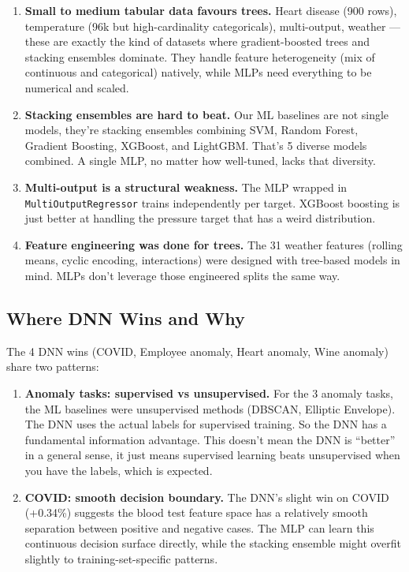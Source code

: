 \documentclass[11pt,a4paper]{article}
\begin{document}
\begin{enumerate}[leftmargin=1.2em,itemsep=0.15em]
    \item \textbf{Small to medium tabular data favours trees.} Heart disease (900 rows), temperature (96k but high-cardinality categoricals), multi-output, weather --- these are exactly the kind of datasets where gradient-boosted trees and stacking ensembles dominate. They handle feature heterogeneity (mix of continuous and categorical) natively, while MLPs need everything to be numerical and scaled.
    \item \textbf{Stacking ensembles are hard to beat.} Our ML baselines are not single models, they're stacking ensembles combining SVM, Random Forest, Gradient Boosting, XGBoost, and LightGBM. That's 5 diverse models combined. A single MLP, no matter how well-tuned, lacks that diversity.
    \item \textbf{Multi-output is a structural weakness.} The MLP wrapped in \texttt{MultiOutputRegressor} trains independently per target. XGBoost boosting is just better at handling the pressure target that has a weird distribution.
    \item \textbf{Feature engineering was done for trees.} The 31 weather features (rolling means, cyclic encoding, interactions) were designed with tree-based models in mind. MLPs don't leverage those engineered splits the same way.
\end{enumerate}

\subsection{Where DNN Wins and Why}

The 4 DNN wins (COVID, Employee anomaly, Heart anomaly, Wine anomaly) share two patterns:

\begin{enumerate}[leftmargin=1.2em,itemsep=0.15em]
    \item \textbf{Anomaly tasks: supervised vs unsupervised.} For the 3 anomaly tasks, the ML baselines were unsupervised methods (DBSCAN, Elliptic Envelope). The DNN uses the actual labels for supervised training. So the DNN has a fundamental information advantage. This doesn't mean the DNN is ``better'' in a general sense, it just means supervised learning beats unsupervised when you have the labels, which is expected.
    \item \textbf{COVID: smooth decision boundary.} The DNN's slight win on COVID (+0.34\%) suggests the blood test feature space has a relatively smooth separation between positive and negative cases. The MLP can learn this continuous decision surface directly, while the stacking ensemble might overfit slightly to training-set-specific patterns.
\end{enumerate}
\end{document}
